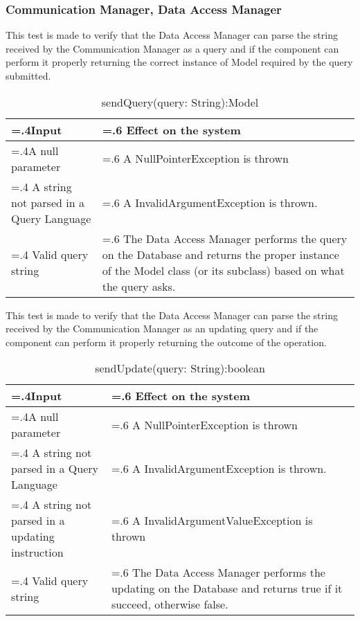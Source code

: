 \documentclass[10pt, a4paper,titlepage]{article}
\begin{document}
\subsubsection{Communication Manager, Data Access Manager} \label{sssec3.2.1}
This test is made to verify that the Data Access Manager can parse the string received by the Communication Manager as a query and if the component can perform it properly returning the correct instance of Model required by the query submitted.
\begin{table}[h]
\caption{sendQuery(query: String):Model}
\begin{tabularx}{\textwidth}{|>{\hsize=.4\hsize}X|>{\hsize=.6\hsize}X|}
\hline
Input & Effect on the system\\
\hline
A null parameter & A NullPointerException is thrown\\ 
\hline
A string not parsed in a Query Language & A InvalidArgumentException is thrown.\\
\hline
Valid query string & The Data Access Manager performs the query on the Database and returns the proper instance of the Model class (or its subclass) based on what the query asks.\\
\hline
\end{tabularx}
\end{table}
This test is made to verify that the Data Access Manager can parse the string received by the Communication Manager as an updating query and if the component can perform it properly returning the outcome of the operation.
\begin{table}[h]
\caption{sendUpdate(query: String):boolean}
\begin{tabularx}{\textwidth}{|>{\hsize=.4\hsize}X|>{\hsize=.6\hsize}X|}
\hline
Input & Effect on the system\\
\hline
A null parameter & A NullPointerException is thrown\\ 
\hline
A string not parsed in a Query Language & A InvalidArgumentException is thrown.\\
\hline
A string not parsed in a updating instruction & A InvalidArgumentValueException is thrown\\
\hline
Valid query string & The Data Access Manager performs the updating on the Database and returns true if it succeed, otherwise false.\\
\hline
\end{tabularx}
\end{table}
\pagebreak
\end{document}

